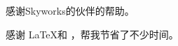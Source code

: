 \begin{acknowledgement}
  感谢Skyworks的伙伴的帮助。

  感谢 \LaTeX 和 \thuthesis\cite{thuthesis}，帮我节省了不少时间。
\end{acknowledgement}
